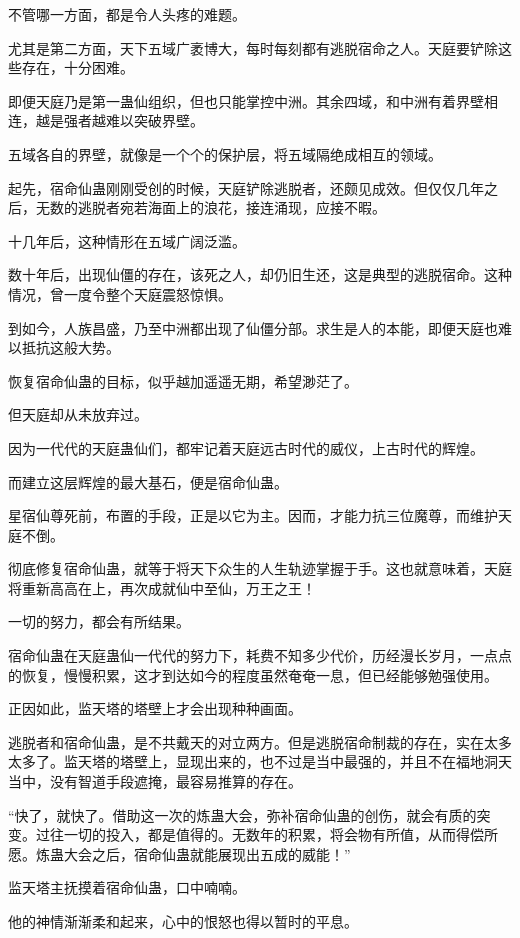 \begin{this_body}
不管哪一方面，都是令人头疼的难题。

尤其是第二方面，天下五域广袤博大，每时每刻都有逃脱宿命之人。天庭要铲除这些存在，十分困难。

即便天庭乃是第一蛊仙组织，但也只能掌控中洲。其余四域，和中洲有着界壁相连，越是强者越难以突破界壁。

五域各自的界壁，就像是一个个的保护层，将五域隔绝成相互的领域。

起先，宿命仙蛊刚刚受创的时候，天庭铲除逃脱者，还颇见成效。但仅仅几年之后，无数的逃脱者宛若海面上的浪花，接连涌现，应接不暇。

十几年后，这种情形在五域广阔泛滥。

数十年后，出现仙僵的存在，该死之人，却仍旧生还，这是典型的逃脱宿命。这种情况，曾一度令整个天庭震怒惊惧。

到如今，人族昌盛，乃至中洲都出现了仙僵分部。求生是人的本能，即便天庭也难以抵抗这般大势。

恢复宿命仙蛊的目标，似乎越加遥遥无期，希望渺茫了。

但天庭却从未放弃过。

因为一代代的天庭蛊仙们，都牢记着天庭远古时代的威仪，上古时代的辉煌。

而建立这层辉煌的最大基石，便是宿命仙蛊。

星宿仙尊死前，布置的手段，正是以它为主。因而，才能力抗三位魔尊，而维护天庭不倒。

彻底修复宿命仙蛊，就等于将天下众生的人生轨迹掌握于手。这也就意味着，天庭将重新高高在上，再次成就仙中至仙，万王之王！

一切的努力，都会有所结果。

宿命仙蛊在天庭蛊仙一代代的努力下，耗费不知多少代价，历经漫长岁月，一点点的恢复，慢慢积累，这才到达如今的程度虽然奄奄一息，但已经能够勉强使用。

正因如此，监天塔的塔壁上才会出现种种画面。

逃脱者和宿命仙蛊，是不共戴天的对立两方。但是逃脱宿命制裁的存在，实在太多太多了。监天塔的塔壁上，显现出来的，也不过是当中最强的，并且不在福地洞天当中，没有智道手段遮掩，最容易推算的存在。

“快了，就快了。借助这一次的炼蛊大会，弥补宿命仙蛊的创伤，就会有质的突变。过往一切的投入，都是值得的。无数年的积累，将会物有所值，从而得偿所愿。炼蛊大会之后，宿命仙蛊就能展现出五成的威能！”

监天塔主抚摸着宿命仙蛊，口中喃喃。

他的神情渐渐柔和起来，心中的恨怒也得以暂时的平息。


\end{this_body}
